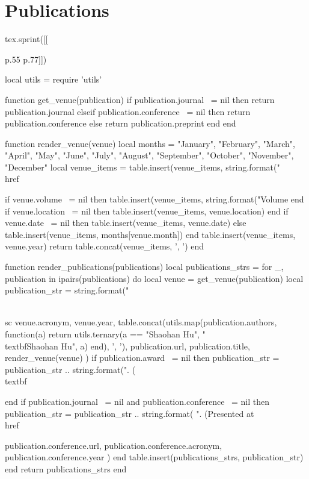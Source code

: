 \section{\sc Publications}

\begin{luacode*}
tex.sprint([[\begin{longtabu}{p{.55\sectionwidth} p{.77\resumewidth}}]])

local utils = require 'utils'

function get_venue(publication)
    if publication.journal ~= nil then
        return publication.journal
    elseif publication.conference ~= nil then
        return publication.conference
    else
        return publication.preprint
    end
end

function render_venue(venue)
    local months = {"January", "February", "March", "April", "May", "June", "July", "August", "September", "October", "November", "December"}
    local venue_items = {}
    table.insert(venue_items, string.format("\\href{%s}{\\textsf{%
    if venue.volume ~= nil then
        table.insert(venue_items, string.format("Volume %
    end
    if venue.location ~= nil then
        table.insert(venue_items, venue.location)
    end
    if venue.date ~= nil then
        table.insert(venue_items, venue.date)
    else
        table.insert(venue_items, months[venue.month])
    end
    table.insert(venue_items, venue.year)
    return table.concat(venue_items, ', ')
end

function render_publications(publications)
    local publications_strs = {}
    for _, publication in ipairs(publications)
    do
        local venue = get_venue(publication)
        local publication_str = string.format("{\\sc %
            venue.acronym,
            venue.year,
            table.concat(utils.map(publication.authors, function(a) return utils.ternary(a == "Shaohan Hu", "\\textbf{Shaohan Hu}", a) end), ', '),
            publication.url,
            publication.title,
            render_venue(venue)
        )
        if publication.award ~= nil then
            publication_str = publication_str .. string.format(". (\\textbf{%
        end
        if publication.journal ~= nil and publication.conference ~= nil then
            publication_str = publication_str .. string.format(
                ". (Presented at \\href{%s}{\\textsf{\\sc %
                publication.conference.url,
                publication.conference.acronym,
                publication.conference.year
            )
        end
        table.insert(publications_strs, publication_str)
    end
    return publications_strs
end

}}}}
\end{longtabu}
\end{luacode*}
